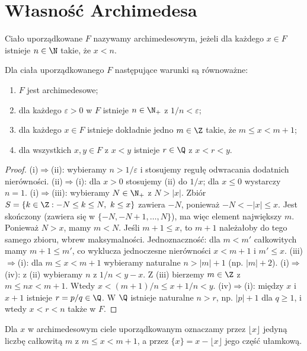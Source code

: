 \section{Własność Archimedesa}
\begin{definicja}
\label{ma1:def:archimedean}
Ciało uporządkowane $F$ nazywamy archimedesowym, jeżeli dla każdego $x\in F$ istnieje $n\in\N$ takie, że $x<n$.
\end{definicja}
\begin{twierdzenie}
\label{ma1:thm:archimedean-equivalences}
Dla ciała uporządkowanego $F$ następujące warunki są równoważne:
\begin{enumerate}[label=(\roman*)]
\item $F$ jest archimedesowe;
\item dla każdego $\varepsilon>0$ w $F$ istnieje $n\in\N_+$ z $1/n<\varepsilon$;
\item dla każdego $x\in F$ istnieje dokładnie jedno $m\in\Z$ takie, że $m\le x<m+1$;
\item dla wszystkich $x,y\in F$ z $x<y$ istnieje $r\in\Q$ z $x<r<y$.
\end{enumerate}
\end{twierdzenie}
\begin{proof}
(i)$\Rightarrow$(ii): wybieramy $n>1/\varepsilon$ i stosujemy regułę odwracania dodatnich nierówności.
(ii)$\Rightarrow$(i): dla $x>0$ stosujemy (ii) do $1/x$; dla $x\le0$ wystarczy $n=1$.
(i)$\Rightarrow$(iii): wybieramy $N\in\N_+$ z $N>|x|$. Zbiór $S=\{k\in\Z:-N\le k\le N,\ k\le x\}$ zawiera $-N$, ponieważ $-N<-|x|\le x$. Jest skończony (zawiera się w $\{-N,-N+1,\ldots,N\}$), ma więc element największy $m$. Ponieważ $N>x$, mamy $m<N$. Jeśli $m+1\le x$, to $m+1$ należałoby do tego samego zbioru, wbrew maksymalności. Jednoznaczność: dla $m<m'$ całkowitych mamy $m+1\le m'$, co wyklucza jednoczesne nierówności $x<m+1$ i $m'\le x$.
(iii)$\Rightarrow$(i): dla $m\le x<m+1$ wybieramy naturalne $n>|m|+1$ (np. $|m|+2$).
(i)$\Rightarrow$(iv): z (ii) wybieramy $n$ z $1/n<y-x$. Z (iii) bierzemy $m\in\Z$ z $m\le nx<m+1$. Wtedy $x<(m+1)/n\le x+1/n<y$.
(iv)$\Rightarrow$(i): między $x$ i $x+1$ istnieje $r=p/q\in\Q$. W $\Q$ istnieje naturalne $n>r$, np. $|p|+1$ dla $q\ge1$, i wtedy $x<r<n$ także w $F$.
\end{proof}
\begin{definicja}
Dla $x$ w archimedesowym ciele uporządkowanym oznaczamy przez $\lfloor x\rfloor$ jedyną liczbę całkowitą $m$ z $m\le x<m+1$, a przez $\{x\}=x-\lfloor x\rfloor$ jego część ułamkową.
\end{definicja}

